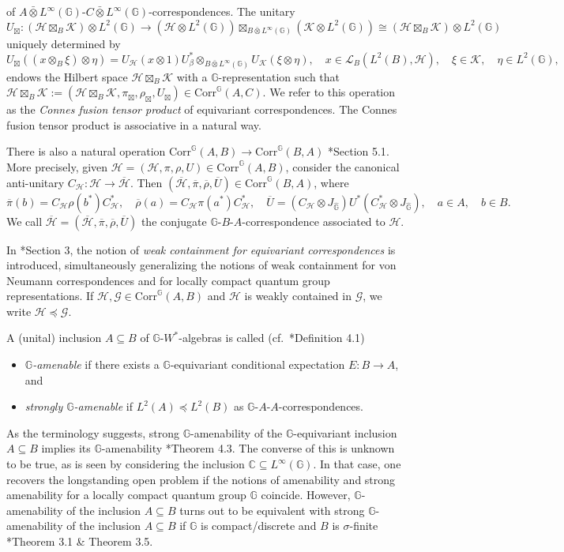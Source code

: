 \documentclass[reqno]{amsart}
\numberwithin{equation}{section}
\newcommand{\mcG}{\mathcal{G}}
\newcommand{\mcH}{\mathcal{H}}
\newcommand{\mcK}{\mathcal{K}}
\newcommand{\C}{\mathbb{C}}
\newcommand{\G}{\mathbb{G}}
\newcommand{\Corr}{\mathrm{Corr}}
\newcommand{\ovot}{\bar{\otimes}}
\begin{document}
of $A\ovot L^\infty(\G)$-$C \ovot L^\infty(\G)$-correspondences. The unitary 
$$U_\boxtimes: (\mcH\boxtimes_B \mcK)\otimes L^2(\G) \to (\mcH\otimes L^2(\G))\boxtimes_{B\ovot L^\infty(\G)} (\mcK\otimes L^2(\G)) \cong  (\mcH\boxtimes_B \mcK)\otimes L^2(\G)$$
uniquely determined by
$$U_\boxtimes((x\otimes_B\xi)\otimes \eta)= U_\mcH(x\otimes 1)U_\beta^* \otimes_{B\ovot L^\infty(\G)} U_\mcK(\xi \otimes \eta), \quad x\in \mathscr{L}_B(L^2(B), \mcH), \quad \xi \in \mcK, \quad \eta \in L^2(\G),$$
endows the Hilbert space $\mcH\boxtimes_B \mcK$ with a $\G$-representation such that $\mcH\boxtimes_B \mcK := (\mcH\boxtimes_B \mcK, \pi_\boxtimes, \rho_\boxtimes, U_\boxtimes)\in \Corr^\G(A,C)$. We refer to this operation as the \emph{Connes fusion tensor product} of equivariant correspondences. The Connes fusion tensor product is associative in a natural way. 

There is also a natural operation $\Corr^\G(A,B)\to \Corr^\G(B,A)$ \cite{DCDR24}*{Section 5.1}. More precisely, given $\mcH = (\mcH, \pi, \rho, U)\in \Corr^\G(A,B)$, consider the canonical anti-unitary $C_\mcH: \mcH\to \overline{\mcH}$. Then $(\overline{\mcH}, \overline{\pi}, \overline{\rho}, \overline{U})\in \Corr^\G(B,A)$, where 
$$\overline{\pi}(b) = C_\mcH\rho(b^*)C_\mcH^*, \quad \overline{\rho}(a)= C_\mcH \pi(a^*)C_\mcH^*, \quad \overline{U}= (C_\mcH \otimes J_{\hat{\G}})U^*(C_\mcH^*\otimes J_{\hat{\G}}), \quad a\in A, \quad b\in B.$$
We call $\overline{\mcH}= (\overline{\mcH}, \overline{\pi}, \overline{\rho}, \overline{U})$ the conjugate $\G$-$B$-$A$-correspondence associated to $\mcH$.

In \cite{DCDR24}*{Section 3}, the notion of \emph{weak containment for equivariant correspondences} is introduced, simultaneously generalizing the notions of weak containment for von Neumann correspondences and for locally compact quantum group representations. If $\mcH, \mcG \in \Corr^\G(A,B)$ and $\mcH$ is weakly contained in $\mcG$, we write $\mcH\preccurlyeq \mcG$.

A (unital) inclusion $A\subseteq B$ of $\G$-$W^*$-algebras is called (cf.\ \cite{DCDR24}*{Definition 4.1})
\begin{itemize}
    \item \emph{$\G$-amenable} if there exists a $\G$-equivariant conditional expectation $E: B\to A$, and 
    \item\vspace{-1.5mm} \emph{strongly $\G$-amenable} if $L^2(A)\preccurlyeq L^2(B)$ as $\G$-$A$-$A$-correspondences.
\end{itemize} 
As the terminology suggests, strong $\G$-amenability of the $\G$-equivariant inclusion $A\subseteq B$ implies its $\G$-amenability \cite{DCDR24}*{Theorem 4.3}. The converse of this is unknown to be true, as is seen by considering the inclusion $\C\subseteq L^\infty(\G)$. In that case, one recovers the longstanding open problem if the notions of amenability and strong amenability for a locally compact quantum group $\G$ coincide. However, $\G$-amenability of the inclusion $A\subseteq B$ turns out to be equivalent with strong $\G$-amenability of the inclusion $A\subseteq B$ if $\G$ is compact/discrete and $B$ is $\sigma$-finite \cite{DCDR25}*{Theorem 3.1 \& Theorem 3.5}.
\end{document}
